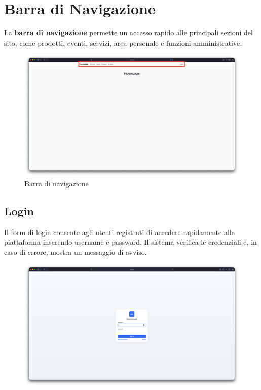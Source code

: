 \documentclass[a4paper,12pt]{report}
\begin{document}
\section{Barra di Navigazione}
La \textbf{barra di navigazione} permette un accesso rapido alle
principali sezioni del sito,
come prodotti, eventi, servizi, area personale e funzioni amministrative.

\begin{figure}[H]
  \centering
  \includegraphics[width=\textwidth, trim=0 0 0 0]{./img/navbar.png}
  \caption{Barra di navigazione}
  \label{fig:navbar}
\end{figure}

\newpage
\subsection*{Login}

Il form di login consente agli utenti registrati di accedere
rapidamente alla piattaforma inserendo username e
password. Il sistema verifica le credenziali e, in caso di errore,
mostra un messaggio di avviso.

\begin{figure}[H]
  \centering
  \includegraphics[width=\textwidth, trim=0 0 0 0]{./img/login.png}
  \vspace{-1em}
  \label{fig:login}
\end{figure}
\end{document}
